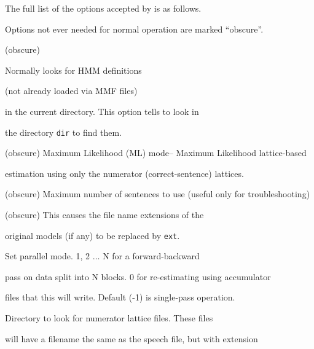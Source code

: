 The full list of the options accepted by  is as follows.


Options not ever needed for normal operation are marked ``obscure''.





\begin{optlist}







      (obscure)


      Normally  looks for HMM definitions


       (not already loaded via MMF files) 


      in the current directory.  This option tells  to look in


      the directory {\tt dir} to find them.





   (obscure) Maximum Likelihood (ML) mode-- Maximum Likelihood lattice-based


   estimation using only the numerator (correct-sentence) lattices.





   (obscure) Maximum number of sentences to use (useful only for troubleshooting)





   (obscure) This causes the file name extensions of the


      original models (if any) to be replaced by {\tt ext}.





    Set parallel mode.  1, 2 $\ldots$ N for a forward-backward


     pass on data split into N blocks.  0 for re-estimating using accumulator


    files that this will write.  Default (-1) is single-pass operation.





     Directory to look for numerator lattice files.  These files


      will have a filename the same as the speech file, but with extension



\end{optlist}
